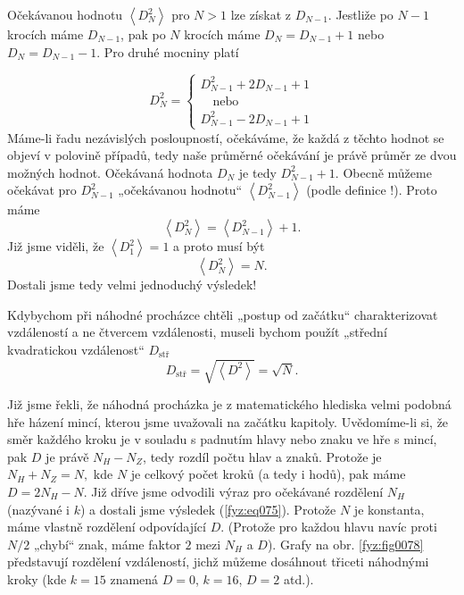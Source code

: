     Očekávanou hodnotu  \(\left\langle D_N^2\right\rangle\) pro \(N>1\) lze získat z \(D_{N-1}\). 
    Jestliže po \(N - 1\) krocích máme \(D_{N-1}\), pak po \(N\) krocích máme \(D_N = D_{N-1} + 1\) 
    nebo \(D_N = D_{N-1} - 1\). Pro druhé mocniny platí
    
    \begin{equation}\label{fyz:eq077}
      D_N^2 = 
        \begin{cases}
          D^2_{N-1} + 2D_{N-1} + 1 \\
          \quad\text{nebo}        \\
          D^2_{N-1} - 2D_{N-1} + 1
        \end{cases}
    \end{equation}
    Máme-li řadu nezávislých posloupností, očekáváme, že každá z těchto hodnot se objeví v polovině 
    případů, tedy naše průměrné očekávání je právě průměr ze dvou možných hodnot. Očekávaná hodnota 
    \(D_N\) je tedy \(D^2_{N-1} + 1\). Obecně můžeme očekávat pro \(D^2_{N-1}\) „očekávanou 
    hodnotu“  \(\left\langle D_{N-1}^2\right\rangle\) (podle definice !). Proto máme
    \begin{equation}\label{fyz:eq078}
      \left\langle D_N^2\right\rangle = \left\langle D_{N-1}^2\right\rangle + 1.
    \end{equation}
    Již jsme viděli, že \(\left\langle D_1^2\right\rangle = 1\) a proto musí být
    \begin{equation}\label{fyz:eq079}
      \left\langle D_N^2\right\rangle = N.
    \end{equation}
    Dostali jsme tedy velmi jednoduchý výsledek!
    
    Kdybychom při náhodné procházce chtěli „postup od začátku“ charakterizovat vzdáleností a ne 
    čtvercem vzdálenosti, museli bychom použít „střední kvadratickou vzdálenost“ \(D_{\text{stř}}\)
    \begin{equation}\label{fyz:eq080}
      D_{\text{stř}} = \sqrt{\left\langle D^2\right\rangle} = \sqrt{N}.
    \end{equation}
    
    Již jsme řekli, že náhodná procházka je z matematického hlediska velmi podobná hře házení 
    mincí, kterou jsme uvažovali na začátku kapitoly. Uvědomíme-li si, že směr každého kroku je v 
    souladu s padnutím hlavy nebo znaku ve hře s mincí, pak \(D\) je právě \(N_H - N_Z\), tedy 
    rozdíl počtu hlav a znaků. Protože je \(N_H + N_Z = N,\) kde \(N\) je celkový počet kroků (a 
    tedy i hodů), pak máme \(D = 2 N_H - N\). Již dříve jsme odvodili výraz pro očekávané rozdělení 
    \(N_H\) (nazývané i \(k\)) a dostali jsme výsledek (\ref{fyz:eq075}). Protože \(N\) je 
    konstanta, máme vlastně rozdělení odpovídající \(D\). (Protože pro každou hlavu navíc proti 
    \(N/2\) „chybí“ znak, máme faktor \(2\) mezi \(N_H\) a \(D\)). Grafy na obr. \ref{fyz:fig0078} 
    představují rozdělení vzdáleností, jichž můžeme dosáhnout třiceti náhodnými kroky (kde \(k = 
    15\) znamená \(D = 0\), \(k= 16\), \(D = 2\) atd.).
    
